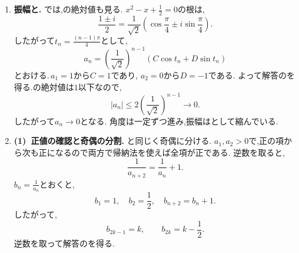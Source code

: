 \begin{enumerate}[label=\textbf{問\arabic*.},leftmargin=3.8em,format=\bookitemlink{practice-special}{solution}{problem}]
                \smallskip
                \noindent \textbf{【別解】}\\
                を一つ進めると,
                \[
                  a_{n+3}=a_{n+2}-a_{n+1}=-a_n.
                \]
                さらに3項進めれば$\displaystyle a_{n+6}=a_n$となる.
                の角度と,直接の式変形による周期の証明が対応している.
          \item \textbf{振幅と.}
                では,の絶対値も見る.
                $\displaystyle x^2-x+\frac12=0$の根は,
                \[
                  \frac{1\pm i}{2}
                    =\frac1{\sqrt2}
                      \left(\cos\frac\pi4\pm i\sin\frac\pi4\right).
                \]
                したがって$\displaystyle t_n=\frac{(n-1)\pi}{4}$として,
                \[
                  a_n=\left(\frac1{\sqrt2}\right)^{n-1}
                    (C\cos t_n+D\sin t_n)
                \]
                とおける.\,$\displaystyle a_1=1$から$\displaystyle C=1$であり,
                $\displaystyle a_2=0$から$\displaystyle D=-1$である.
                よって解答のを得る.の絶対値は$\displaystyle 1$以下なので,
                \[
                  |a_n|\le2\left(\frac1{\sqrt2}\right)^{n-1}\longrightarrow0.
                \]
                したがって$\displaystyle a_n\to0$となる.
                角度は一定ずつ進み,振幅はとして縮んでいる.
          \item \textbf{(1)~正値の確認と奇偶の分割.}
                と同じく奇偶に分ける.
                $a_1,a_2>0$で,正の項から次も正になるので両方で帰納法を使えば全項が正である.
                逆数を取ると,
                \[
                  \frac1{a_{n+2}}=\frac1{a_n}+1.
                \]
                $\displaystyle b_n=\frac1{a_n}$とおくと,
                \[
                  b_1=1,\quad b_2=\frac12,\quad b_{n+2}=b_n+1.
                \]
                したがって,
                \[
                  b_{2k-1}=k,\qquad b_{2k}=k-\frac12.
                \]
                逆数を取って解答のを得る.


\end{enumerate}
